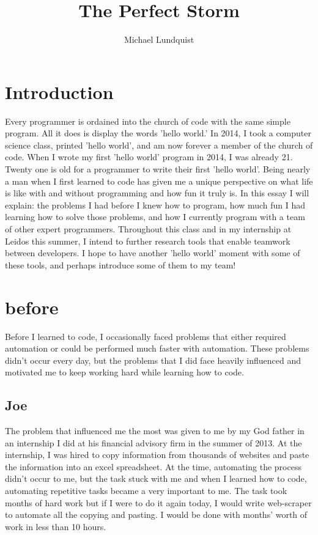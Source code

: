 \documentclass[titlepage]{article}
\author{Michael Lundquist}
\title{The Perfect Storm}
\begin{document}
\maketitle


\section{Introduction}

Every programmer is ordained into the church of code with the same simple program. All it does is display the words 'hello world.' In 2014, I took a computer science class, printed 'hello world', and am now forever a member of the church of code. When I wrote my first 'hello world' program in 2014, I was already 21. Twenty one is old for a programmer to write their first 'hello world'. Being nearly a man when I first learned to code has given me a unique perspective on what life is like with and without programming and how fun it truly is. In this essay I will explain: the problems I had before I knew how to program, how much fun I had learning how to solve those problems, and how I currently program with a team of other expert programmers. Throughout this class and in my internship at Leidos this summer, I intend to further research tools that enable teamwork between developers. I hope to have another 'hello world' moment with some of these tools, and perhaps introduce some of them to my team!

\section{before}

Before I learned to code, I occasionally faced problems that either required automation or could be performed much faster with automation. These problems didn't occur every day, but the problems that I did face heavily influenced and motivated me to keep working hard while learning how to code.

\subsection{Joe}

The problem that influenced me the most was given to me by my God father in an internship I did at his financial advisory firm in the summer of 2013. At the internship, I was hired to copy information from thousands of websites and paste the information into an excel spreadsheet. At the time, automating the process didn't occur to me, but the task stuck with me and when I learned how to code, automating repetitive tasks became a very important to me. The task took months of hard work but if I were to do it again today, I would write web-scraper to automate all the copying and pasting. I would be done with months' worth of work in less than 10 hours.
\end{document}
